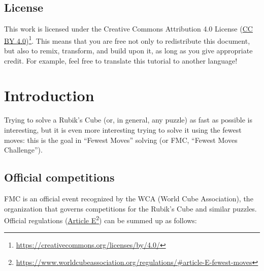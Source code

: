 \documentclass[11pt,a4paper]{book}
\begin{document}
\section*{License}

This work is licensed under the Creative Commons Attribution 4.0 License (\href{https://creativecommons.org/licenses/by/4.0/}{CC BY 4.0})\footnote{\url{https://creativecommons.org/licenses/by/4.0/}}. This means that you are free not only to redistribute this document, but also to remix, transform, and build upon it, as long as you give appropriate credit. For example, feel free to translate this tutorial to another language!

\tableofcontents

\chapter*{Introduction}

Trying to solve a Rubik's Cube (or, in general, any puzzle) as fast as possible is interesting, but it is even more interesting trying to solve it using the fewest moves: this is the goal in ``Fewest Moves'' solving (or FMC, ``Fewest Moves Challenge'').


\section*{Official competitions}

FMC is an official event recognized by the WCA (World Cube Association), the organization that governs competitions for the Rubik's Cube and similar puzzles. Official regulations (\href{https://www.worldcubeassociation.org/regulations/\#article-E-fewest-moves}{Article E}\footnote{\url{https://www.worldcubeassociation.org/regulations/\#article-E-fewest-moves}}) can be summed up as follows:
\end{document}
